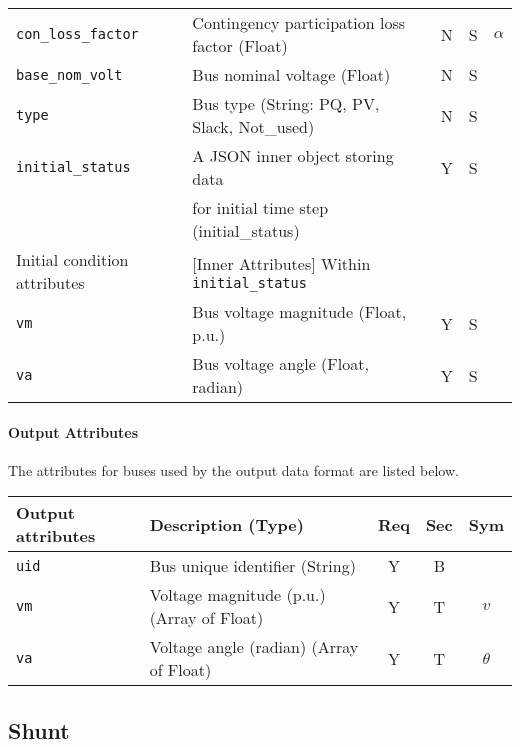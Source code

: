 \documentclass{article}
\begin{document}
\begin{center}
\begin{tabular}{ l | l | c | c | c |}
  \hline
  {\tt con\_loss\_factor} & Contingency participation loss factor (Float) & N & S & $\alpha$\\
  {\tt base\_nom\_volt} & Bus nominal voltage (Float) & N & S & \\
  {\tt type} & Bus type (String: PQ, PV, Slack, Not\_used) & N & S &\\
  {\tt initial\_status} & A JSON inner object storing data  & Y & S &  \\
       & for initial time step (initial\_status) &  &  &  \\
  \hline
  Initial condition attributes & [Inner Attributes] Within {\tt initial\_status} & & & \\
  \hline
  {\tt vm}   & Bus voltage magnitude (Float, p.u.) & Y & S & \\
  {\tt va}   & Bus voltage angle     (Float, radian) & Y & S & \\
  \hline
\end{tabular}
\end{center}
\paragraph{Output Attributes} The attributes for buses used by the output data format are listed below.

\begin{center}
\small
\begin{tabular}{ l | l | c | c | c |}
Output attributes & Description (Type) & Req & Sec & Sym\\
\hline
  {\tt uid} & Bus unique identifier (String) & Y & B & \\
  
  {\tt vm} & Voltage magnitude (p.u.) (Array of Float)  & Y & T & $v$ \\
  {\tt va} & Voltage angle (radian) (Array of Float)  & Y & T & $\theta$\\
\hline
\end{tabular}
\end{center}



\subsection{Shunt}
\label{nom:shunt}
\end{document}
